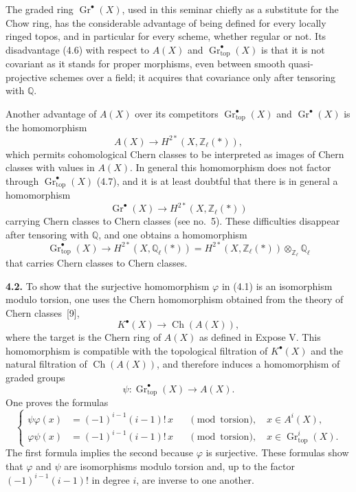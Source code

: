 \documentclass[11pt]{article}
\newcommand{\Q}{\mathbb Q}
\newcommand{\Zell}{\mathbb Z_{\ell}}
\newcommand{\Qell}{\mathbb Q_{\ell}}
\newcommand{\Gtop}{\operatorname{Gr}_{\mathrm{top}}}
\newcommand{\Ch}{\operatorname{Ch}}
\begin{document}
The graded ring $\operatorname{Gr}^\bullet(X)$, used in this seminar chiefly
as a substitute for the Chow ring, has the considerable advantage of being
defined for every locally ringed topos, and in particular for every scheme,
whether regular or not. Its disadvantage (4.6) with respect to $A(X)$ and
$\Gtop^\bullet(X)$ is that it is not covariant as it stands for proper
morphisms, even between smooth quasi-projective schemes over a field; it
acquires that covariance only after tensoring with $\Q$.

Another advantage of $A(X)$ over its competitors $\Gtop^\bullet(X)$ and
$\operatorname{Gr}^\bullet(X)$ is the homomorphism
\[
 A(X)\longrightarrow H^{2*}(X,\Zell(*)),
\]
which permits cohomological Chern classes to be interpreted as images of
Chern classes with values in $A(X)$. In general this homomorphism does not
factor through $\Gtop^\bullet(X)$ (4.7), and it is at least doubtful that
there is in general a homomorphism
\[
 \operatorname{Gr}^\bullet(X)\longrightarrow H^{2*}(X,\Zell(*))
\]
carrying Chern classes to Chern classes (see no.~5). These difficulties
disappear after tensoring with $\Q$, and one obtains a homomorphism
\begin{equation*}\tag{4.2}
 \Gtop^\bullet(X)\longrightarrow H^{2*}(X,\Qell(*))
 =H^{2*}(X,\Zell(*))\otimes_{\Zell}\Qell
\end{equation*}
that carries Chern classes to Chern classes.

\noindent\textbf{4.2.}
To show that the surjective homomorphism $\varphi$ in (4.1) is an
isomorphism modulo torsion, one uses the Chern homomorphism obtained from the
theory of Chern classes~[9],
\[
 K^\bullet(X)\longrightarrow \Ch(A(X)),
\]
where the target is the Chern ring of $A(X)$ as defined in Expose V. This
homomorphism is compatible with the topological filtration of $K^\bullet(X)$
and the natural filtration of $\Ch(A(X))$, and therefore induces a
homomorphism of graded groups
\begin{equation*}\tag{4.3}
 \psi:\Gtop^\bullet(X)\longrightarrow A(X).
\end{equation*}
One proves the formulas
\begin{equation*}\tag{4.4}
\left\{
\begin{aligned}
 \psi\varphi(x)&=(-1)^{i-1}(i-1)!\,x
   &&\pmod{\text{torsion}},\quad x\in A^i(X),\\
 \varphi\psi(x)&=(-1)^{i-1}(i-1)!\,x
   &&\pmod{\text{torsion}},\quad x\in \Gtop^i(X).
\end{aligned}
\right.
\end{equation*}
The first formula implies the second because $\varphi$ is surjective. These
formulas show that $\varphi$ and $\psi$ are isomorphisms modulo torsion and,
up to the factor $(-1)^{i-1}(i-1)!$ in degree $i$, are inverse to one
another.
\end{document}
